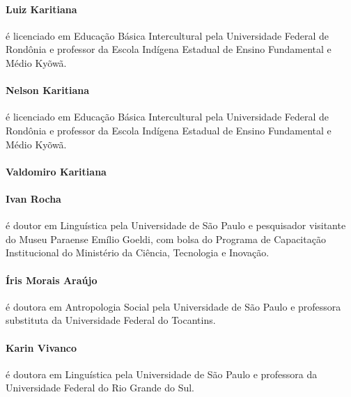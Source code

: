 \paragraph{Luiz Karitiana} é licenciado em Educação Básica Intercultural pela Universidade Federal de Rondônia e professor da Escola Indígena Estadual de Ensino Fundamental e Médio Kyõwã.
\vspace{-0.2cm}

\paragraph{Nelson Karitiana} é licenciado em Educação Básica Intercultural pela Universidade Federal de Rondônia e professor da Escola Indígena Estadual de Ensino Fundamental e Médio Kyõwã.
\vspace{-0.2cm}

\paragraph{Valdomiro Karitiana}  
\vspace{-0.2cm}

\paragraph{Ivan Rocha} é doutor em Linguística pela Universidade de São Paulo e pesquisador visitante do Museu Paraense Emílio Goeldi, com bolsa do Programa de Capacitação Institucional do Ministério da Ciência, Tecnologia e Inovação. 
\vspace{-0.2cm}

\paragraph{Íris Morais Araújo} é doutora em Antropologia Social pela Universidade de São Paulo e professora substituta da Universidade Federal do Tocantins.%
\vspace{-0.2cm}

\paragraph{Karin Vivanco} é doutora em Linguística pela Universidade de São Paulo e professora da Universidade Federal do Rio Grande do Sul.

